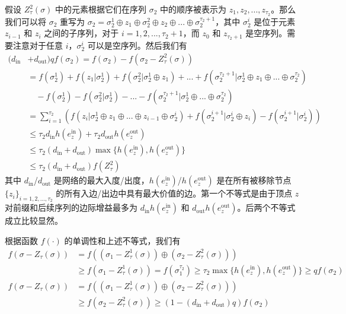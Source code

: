 假设 $Z^2_\tau(\sigma)$ 中的元素根据它们在序列 $\sigma_2$ 中的顺序被表示为 $z_1,z_2,...,z_{\tau_2}$。那么我们可以将 $\sigma_2$ 重写为 $\sigma_2=\sigma_2^1\oplus z_1 \oplus \sigma_2^2 \oplus z_2 \oplus ... \oplus \sigma_2^{\tau_2+1}$，其中 $\sigma_2^i$ 是位于元素 $z_{i-1}$ 和 $z_i$ 之间的子序列，对于 $i=1,2,...,\tau_2+1$，而 $z_0$ 和 $z_{\tau_2+1}$ 是空序列。需要注意对于任意 $i$，$\sigma_2^i$ 可以是空序列。然后我们有
\begin{align}
(d_{\text{in}} & + d_{\text{out}}) q f(\sigma_2) = f(\sigma_2) - f(\sigma_2-Z_\tau^2(\sigma)) \\
& = f(\sigma_2^1) + f(z_1|\sigma_2^1)+f(\sigma_2^2| \sigma_2^1\oplus z_1) + ... + f(\sigma_2^{\tau_2+1}| \sigma_2^1\oplus z_1 \oplus ... \oplus \sigma_2^{\tau_2}) \nonumber \\
& \quad - f(\sigma_2^1) -f(\sigma_2^2|\sigma_2^1) - ... - f(\sigma_2^{\tau_2+1}| \sigma_2^1\oplus ... \oplus \sigma_2^{\tau_2}) \\
& = \sum_{i=1}^{\tau_2} \left( f(z_i|\sigma_2^1\oplus z_1 \oplus ... \oplus z_{i-1}\oplus \sigma_2^i)+f(\sigma_2^{i+1}|\sigma_2^i\oplus z_i) - f(\sigma_2^{i+1}|\sigma_2^i) \right)\\
& \le \tau_2 d_{\text{in}} h(e_z^{\text{in}}) + \tau_2 d_{\text{out}} h(e_z^{\text{out}}) \\
& \le \tau_2(d_{\text{in}} + d_{\text{out}}) \max \{h(e_z^{\text{in}}),h(e_z^{\text{out}})\} \\
& \le \tau_2(d_{\text{in}} + d_{\text{out}}) f(Z_\tau^2)
\end{align}
\noindent 其中 $d_{\text{in}}$/$d_{\text{out}}$ 是网络的最大入度/出度，$h(e_z^{\text{in}})$/$h(e_z^{\text{out}})$ 是在所有被移除节点 $\{z_i\}_{i=1,2,...,\tau_2}$ 的所有入边/出边中具有最大价值的边。第一个不等式是由于顶点 $z$ 对前缀和后续序列的边际增益最多为 $d_{\text{in}} h(e_z^{\text{in}})$ 和 $d_{\text{out}} h(e_z^{\text{out}})$。后两个不等式成立比较显然。

根据函数 $f(\cdot)$ 的单调性和上述不等式，我们有
\begin{align}
f(\sigma- Z_\tau(\sigma)) & = f((\sigma_1 - Z_\tau^1(\sigma)) \oplus (\sigma_2 - Z_\tau^2(\sigma))) \\ &\ge f(\sigma_1 - Z_\tau^1(\sigma)) = f(\sigma_1^{\tau_2}) \ge \tau_2 \max \{h(e_z^{\text{in}}),h(e_z^{\text{out}})\} \ge q f(\sigma_2) \\
f(\sigma-Z_\tau(\sigma)) & = f((\sigma_1 - Z_\tau^1(\sigma)) \oplus (\sigma_2 - Z_\tau^2(\sigma))) \\ & \ge f(\sigma_2 -Z_\tau^2(\sigma)) \ge (1-(d_{\text{in}} + d_{\text{out}})q) f(\sigma_2)
\end{align}

